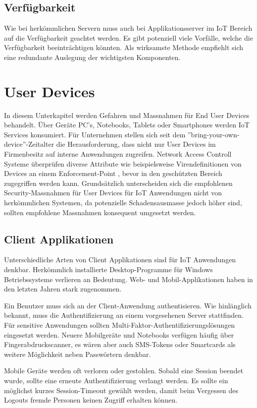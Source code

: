 \subsection{Verfügbarkeit}
Wie bei herkömmlichen Servern muss auch bei Applikationsserver im IoT Bereich auf die Verfügbarkeit geachtet werden. Es gibt potenziell viele Vorfälle, welche die Verfügbarkeit beeinträchtigen könnten. Als wirksamste Methode empfiehlt sich eine redundante Auslegung der wichtigsten Komponenten.

\section{User Devices}
In diesem Unterkapitel werden Gefahren und Massnahmen für End User Devices behandelt. Über Geräte PC's, Notebooks, Tablets oder Smartphones werden IoT Services konsumiert. Für Unternehmen stellen sich seit dem ''bring-your-own-device''-Zeitalter die Herausforderung, dass nicht nur User Devices im Firmenbesitz auf interne Anwendungen zugreifen. Network Access Controll Systeme überprüfen diverse Attribute wie beispielsweise Virendefinitionen von Devices an einem Enforcement-Point , bevor in den geschützten Bereich zugegriffen werden kann. Grundsätzlich unterscheiden sich die empfohlenen Security-Massnahmen für User Devices für IoT Anwendungen nicht von herkömmlichen Systemen, da potenzielle Schadensausmasse jedoch höher sind, sollten empfohlene Massnahmen konsequent umgesetzt werden.

\subsection{Client Applikationen}
Unterschiedliche Arten von Client Applikationen sind für IoT Anwendungen denkbar. Herkömmlich installierte Desktop-Programme für Windows Betriebssysteme verlieren an Bedeutung. Web- und Mobil-Applikationen haben in den letzten Jahren stark zugenommen. 

Ein Benutzer muss sich an der Client-Anwendung authentisieren. Wie hinlänglich bekannt, muss die Authentifizierung an einem vorgesehenen Server stattfinden. Für sensitive Anwendungen sollten Multi-Faktor-Authentifizierungslösungen eingesetzt werden. Neuere Mobilgeräte und Notebooks verfügen häufig über Fingerabdruckscanner, es wären aber auch SMS-Tokens oder Smartcards als weitere Möglichkeit neben Passwörtern denkbar.

Mobile Geräte werden oft verloren oder gestohlen. Sobald eine Session beendet wurde, sollte eine erneute Authentifizierung verlangt werden. Es sollte ein möglichst kurzes Session-Timeout gewählt werden, damit beim Vergessen des Logouts fremde Personen keinen Zugriff erhalten können.

